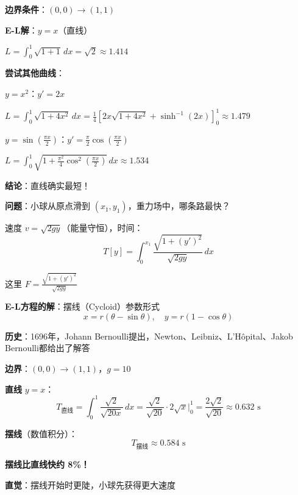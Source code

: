 \documentclass[12pt, a4paper]{ctexart}
\begin{document}
\begin{blackboard}[例1数值验证]

\textbf{边界条件}：$(0, 0) \to (1, 1)$

\textbf{E-L解}：$y = x$（直线）

$L = \int_0^1 \sqrt{1 + 1} \, dx = \sqrt{2} \approx \mathbf{1.414}$

\textbf{尝试其他曲线}：

$y = x^2$：$y' = 2x$

$L = \int_0^1 \sqrt{1 + 4x^2} \, dx = \frac{1}{4}\left[ 2x\sqrt{1+4x^2} + \sinh^{-1}(2x) \right]_0^1 \approx \mathbf{1.479}$

$y = \sin(\frac{\pi x}{2})$：$y' = \frac{\pi}{2}\cos(\frac{\pi x}{2})$

$L = \int_0^1 \sqrt{1 + \frac{\pi^2}{4}\cos^2(\frac{\pi x}{2})} \, dx \approx \mathbf{1.534}$

\textbf{结论}：直线确实最短！

\end{blackboard}

\begin{blackboard}[例2：最速降线]

\textbf{问题}：小球从原点滑到 $(x_1, y_1)$，重力场中，哪条路最快？

速度 $v = \sqrt{2gy}$（能量守恒），时间：
\[
T[y] = \int_0^{x_1} \frac{\sqrt{1 + (y')^2}}{\sqrt{2gy}} \, dx
\]

这里 $F = \frac{\sqrt{1 + (y')^2}}{\sqrt{2gy}}$

\textbf{E-L方程的解}：摆线（Cycloid）参数形式
\[
x = r(\theta - \sin\theta), \quad y = r(1 - \cos\theta)
\]

\textbf{历史}：1696年，Johann Bernoulli提出，Newton、Leibniz、L'Hôpital、Jakob Bernoulli都给出了解答

\end{blackboard}

\begin{blackboard}[例2数值验证]

\textbf{边界}：$(0, 0) \to (1, 1)$，$g = 10$

\textbf{直线} $y = x$：
\[
T_{\text{直线}} = \int_0^1 \frac{\sqrt{2}}{\sqrt{20x}} \, dx = \frac{\sqrt{2}}{\sqrt{20}} \cdot 2\sqrt{x}\Big|_0^1 = \frac{2\sqrt{2}}{\sqrt{20}} \approx \mathbf{0.632} \text{ s}
\]

\textbf{摆线}（数值积分）：
\[
T_{\text{摆线}} \approx \mathbf{0.584} \text{ s}
\]

\textbf{摆线比直线快约 8\%！}

\textbf{直觉}：摆线开始时更陡，小球先获得更大速度

\end{blackboard}
\end{document}
